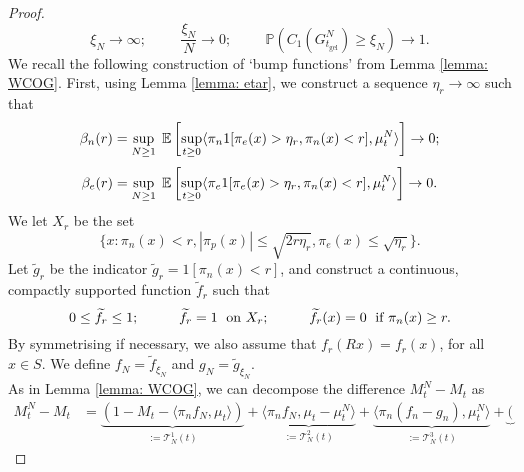 \begin{proof}
\begin{equation}
       \xi_N\rightarrow \infty; \hspace{1cm} \frac{\xi_N}{N}\rightarrow 0; \hspace{1cm}\mathbb{P}(C_1(G^N_{t_\text{gel}})\geq \xi_N)\rightarrow 1.
   \end{equation}  We recall the following construction of `bump functions' from Lemma \ref{lemma: WCOG}. First, using Lemma \ref{lemma: etar}, we construct a sequence $\eta_r \rightarrow \infty$ such that \begin{equation}\label{eq: choice of etar 1}
    \beta_n(r)=\sup_{N\geq 1} \hspace{0.1cm} \mathbb{E}\left[\sup_{t\geq 0}\langle \pi_n 1[\pi_e(x)>\eta_r, \pi_n(x)< r], \mu^N_t\rangle \right]\rightarrow 0;
\end{equation} \begin{equation} \label{eq: choice of etar 2}
    \beta_e(r)= \sup_{N\geq 1} \hspace{0.1cm} \mathbb{E}\left[\sup_{t\geq 0}\langle \pi_e 1[\pi_e(x)>\eta_r, \pi_n(x)< r], \mu^N_t\rangle\right] \rightarrow 0. 
\end{equation} We let $X_r$ be the set \begin{equation}
       \{x: \pi_n(x)< r, |\pi_p(x)|\leq \sqrt{2r\eta_r}, \pi_e(x)\leq \sqrt{\eta_r}\}.
   \end{equation} Let $\widetilde{g}_r$ be the indicator $\widetilde{g}_r=1[\pi_n(x)< r]$, and construct a continuous, compactly supported function $\widetilde{f}_r$ such that \begin{equation}
      0\leq \widetilde{f}_r\leq 1;\hspace{1cm} \widetilde{f}_r=1 \hspace{0.1cm} \text{ on } X_r;\hspace{1cm} \widetilde{f}_r(x)=0 \hspace{0.1cm} \text{ if } \pi_n(x)\ge r.
   \end{equation} By symmetrising if necessary, we also assume that $f_r(Rx)=f_r(x)$, for all $x\in S$. We define $f_N=\widetilde{f}_{\xi_N}$ and $g_N=\widetilde{g}_{\xi_N}$. \medskip \\ As in Lemma \ref{lemma: WCOG}, we can decompose the difference $M^N_t-M_t$ as \begin{equation}\label{eq: decomposition of erorr}\begin{split} M^N_t-M_t &= \underbrace{(1-M_t-\langle \pi_n f_N, \mu_t\rangle)}_{:=\mathcal{T}^1_N(t)} + \underbrace{\langle \pi_n f_N, \mu_t-\mu^N_t\rangle}_{:=\mathcal{T}^2_N(t)} + \underbrace{\langle \pi_n (f_n-g_n), \mu^N_t\rangle}_{:=\mathcal{T}^3_N(t)} +\underbrace{(
}
\end{split}
\end{equation}
\end{proof}
